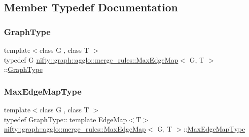 \subsection{Member Typedef Documentation}
\mbox{\label{classnifty_1_1graph_1_1agglo_1_1merge__rules_1_1MaxEdgeMap_a7b996d3f4737ff2b77cca85520e62510}} 
\subsubsection{\texorpdfstring{Graph\+Type}{GraphType}}
{\footnotesize\ttfamily template$<$class G , class T $>$ \\
typedef G \hyperlink{classnifty_1_1graph_1_1agglo_1_1merge__rules_1_1MaxEdgeMap}{nifty\+::graph\+::agglo\+::merge\+\_\+rules\+::\+Max\+Edge\+Map}$<$ G, T $>$\+::\hyperlink{classnifty_1_1graph_1_1agglo_1_1merge__rules_1_1MaxEdgeMap_a7b996d3f4737ff2b77cca85520e62510}{Graph\+Type}}

\mbox{\label{classnifty_1_1graph_1_1agglo_1_1merge__rules_1_1MaxEdgeMap_a7ebdeaafb5f49f80a7c43206826a706b}} 
\subsubsection{\texorpdfstring{Max\+Edge\+Map\+Type}{MaxEdgeMapType}}
{\footnotesize\ttfamily template$<$class G , class T $>$ \\
typedef Graph\+Type\+:: template Edge\+Map$<$T$>$ \hyperlink{classnifty_1_1graph_1_1agglo_1_1merge__rules_1_1MaxEdgeMap}{nifty\+::graph\+::agglo\+::merge\+\_\+rules\+::\+Max\+Edge\+Map}$<$ G, T $>$\+::\hyperlink{classnifty_1_1graph_1_1agglo_1_1merge__rules_1_1MaxEdgeMap_a7ebdeaafb5f49f80a7c43206826a706b}{Max\+Edge\+Map\+Type}}


